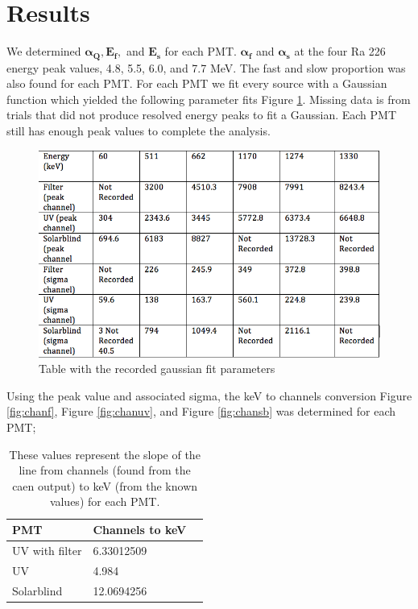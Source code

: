 \section{\label{sec:level1}Results}

We determined $\bm{\alpha_Q, E_f,}$ and $\bm{E_s}$ for each PMT. $\bm{\alpha_f}$ and $\bm{\alpha_s}$ at the four Ra 226 energy peak values, 4.8, 5.5, 6.0, and 7.7 MeV. The fast and slow proportion was also found for each PMT. For each PMT we fit every source with a Gaussian function which yielded the following parameter fits Figure \ref{fig:gaussfits}. Missing data is from trials that did not produce resolved energy peaks to fit a Gaussian. Each PMT still has enough peak values to complete the analysis. 

\begin{figure}
  \centering
    \includegraphics[width=.9\columnwidth]{gaussfits.png}
  \caption{Table with the recorded gaussian fit parameters}
  \label{fig:gaussfits}
\end{figure} 

\noindent
Using the peak value and associated sigma, the keV to channels conversion Figure \ref{fig:chanf}, Figure \ref{fig:chanuv}, and Figure \ref{fig:chansb} was determined for each PMT; 

\begin{table}
    \begin{tabular}{ | l | l | p{2cm} |}
    \hline
    PMT & Channels to keV\\ \hline

    UV with filter & 6.33012509\\ \hline  

    UV & 4.984\\ \hline

    Solarblind & 12.0694256\\ \hline
    \hline
    \end{tabular}
    \caption{These values represent the slope of the line from channels (found from the caen output) to keV (from the known values) for each PMT.}
    \label{table:chan_kev}
\end{table}

